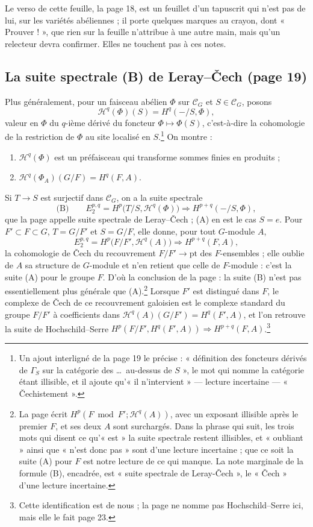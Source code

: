 \documentclass[11pt,a4paper]{article}
\begin{document}
Le verso de cette feuille, la page 18, est un feuillet d'un tapuscrit qui
n'est pas de lui, sur les variétés abéliennes ; il porte quelques marques au
crayon, dont « Prouver ! », que rien sur la feuille n'attribue à une autre
main, mais qu'un relecteur devra confirmer. Elles ne touchent pas à ces
notes.

\subsection*{La suite spectrale (B) de Leray--Čech (page 19)}

Plus généralement, pour un faisceau abélien $\Phi$ sur $\mathcal{C}_G$ et
$S \in \mathcal{C}_G$, posons
\[
  \mathcal{H}^{q}(\Phi)(S) = H^{q}(-/S, \Phi),
\]
valeur en $\Phi$ du $q$-ième dérivé du foncteur $\Phi \mapsto \Phi(S)$,
c'est-à-dire la cohomologie de la restriction de $\Phi$ au site localisé
en $S$.\footnote{Un ajout interligné de la page 19 le précise :
« définition des foncteurs dérivés de $\Gamma_S$ sur la catégorie des
\dots\ au-dessus de $S$ », le mot qui nomme la catégorie étant illisible,
et il ajoute qu'« il n'intervient » --- lecture incertaine ---
« Čechistement ».} On montre :
\begin{enumerate}
\item[(i)] $\mathcal{H}^{q}(\Phi)$ est un préfaisceau qui transforme sommes
finies en produits ;
\item[(ii)] $\mathcal{H}^{q}(\Phi_A)(G/F) = H^{q}(F, A)$.
\end{enumerate}
Si $T \to S$ est surjectif dans $\mathcal{C}_G$, on a la suite spectrale
\[
  \text{(B)}\qquad
  E_2^{p,q} = H^{p}\bigl(T/S, \mathcal{H}^{q}(\Phi)\bigr) \Longrightarrow
  H^{p+q}(-/S, \Phi),
\]
que la page appelle suite spectrale de Leray--Čech ; (A) en est le cas
$S = e$. Pour $F' \subset F \subset G$, $T = G/F'$ et $S = G/F$, elle donne,
pour tout $G$-module $A$,
\[
  E_2^{p,q} = H^{p}\bigl(F/F', \mathcal{H}^{q}(A)\bigr) \Longrightarrow
  H^{p+q}(F, A),
\]
la cohomologie de Čech du recouvrement $F/F' \to \mathrm{pt}$ des
$F$-ensembles ; elle oublie de $A$ sa structure de $G$-module et n'en
retient que celle de $F$-module : c'est la suite (A) pour le groupe $F$.
D'où la conclusion de la page : la suite (B) n'est pas essentiellement plus
générale que (A).\footnote{La page écrit
$H^{p}(F \bmod F' ; \mathcal{H}^{q}(A))$, avec un exposant illisible après
le premier $F$, et ses deux $A$ sont surchargés. Dans la phrase qui suit,
les trois mots qui disent ce qu'« est » la suite spectrale restent
illisibles, et « oubliant » ainsi que « n'est donc pas » sont d'une lecture
incertaine ; que ce soit la suite (A) pour $F$ est notre lecture de ce qui
manque. La note marginale de la formule (B), encadrée, est « suite
spectrale de Leray-Čech », le « Čech » d'une lecture incertaine.} Lorsque $F'$ est
distingué dans $F$, le complexe de Čech de ce recouvrement galoisien est le
complexe standard du groupe $F/F'$ à coefficients dans
$\mathcal{H}^{q}(A)(G/F') = H^{q}(F', A)$, et l'on retrouve la suite de
Hochschild--Serre $H^{p}(F/F', H^{q}(F', A)) \Rightarrow
H^{p+q}(F, A)$.\footnote{Cette identification est de nous ; la page ne
nomme pas Hochschild--Serre ici, mais elle le fait page 23.}
\end{document}
